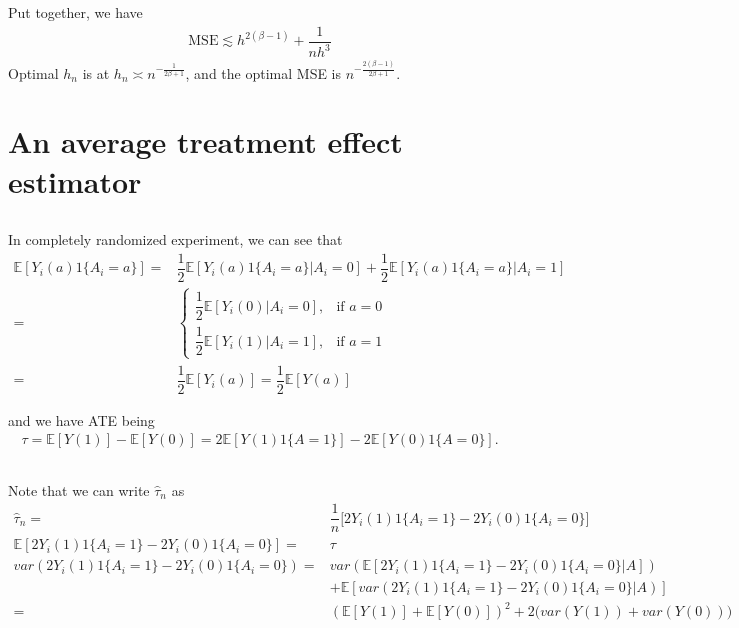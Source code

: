 \documentclass[11pt,a4paper]{ctexart}
\numberwithin{equation}{section}%
\begin{document}
Put together, we have
\begin{align*}
    \mathrm{ MSE } \lesssim h^{2(\beta -1 )} + \dfrac{ 1 }{ nh^3 } 
\end{align*}
Optimal $ h_n $ is at $ h_n \asymp n^{-\frac{ 1 }{ 2\beta + 1 }} $, and the optimal MSE is $ n^{-\frac{ 2(\beta-1) }{ 2\beta + 1 }} $.


    

\section{An average treatment effect estimator}

\subsection{}
In completely randomized experiment, we can see that 
\begin{align*}
    \mathbb{E}\left[ Y_i(a)1\{A_i=a\} \right] =& \dfrac{ 1 }{ 2 }\mathbb{E}\left[ Y_i(a)1\{A_i=a\} |A_i = 0 \right]    + \dfrac{ 1 }{ 2 }\mathbb{E}\left[ Y_i(a)1\{A_i=a\} |A_i = 1 \right]\\
    =& \begin{cases}
        \dfrac{ 1 }{ 2 }\mathbb{E}\left[ Y_i(0) |A_i = 0 \right]    ,&\text{if } a = 0\\
        \dfrac{ 1 }{ 2 }\mathbb{E}\left[ Y_i(1) |A_i = 1 \right]    ,&\text{if } a = 1
    \end{cases}\\
    =& \dfrac{ 1 }{ 2 } \mathbb{E}\left[ Y_i(a) \right] = \dfrac{ 1 }{ 2 }\mathbb{E}\left[ Y(a) \right]
\end{align*}

and we have ATE being
\begin{align*}
    \tau = \mathbb{E}\left[ Y(1) \right] - \mathbb{E}\left[ Y(0) \right] = 2\mathbb{E}\left[ Y(1)1\{A=1\} \right] - 2\mathbb{E}\left[ Y(0)1\{A=0\} \right].
\end{align*}

\subsection{}
Note that we can write $ \hat{\tau}_n $ as 
\begin{align*}
    \hat{\tau}_n =& \dfrac{ 1 }{ n }\big[2 Y_i(1)1\{A_i=1\} - 2 Y_i(0)1\{A_i=0\}\big]\\
    \mathbb{E}\left[ 2 Y_i(1)1\{A_i=1\} - 2 Y_i(0)1\{A_i=0\} \right] = & \tau\\
    var(2 Y_i(1)1\{A_i=1\} - 2 Y_i(0)1\{A_i=0\}) =& var(\mathbb{E}\left[ 2 Y_i(1)1\{A_i=1\} - 2 Y_i(0)1\{A_i=0\} |A \right]) \\ &+ \mathbb{E}\left[ var(2 Y_i(1)1\{A_i=1\} - 2 Y_i(0)1\{A_i=0\} |A) \right]\\
    =& (\mathbb{E}\left[ Y(1) \right] +\mathbb{E}\left[ Y(0) \right] ) ^2 + 2 \big(var(Y(1)) + var(Y(0))\big)
\end{align*}
\end{document}
